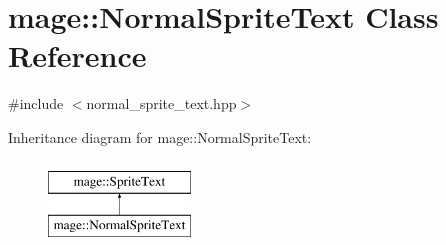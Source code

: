 \hypertarget{classmage_1_1_normal_sprite_text}{}\section{mage\+:\+:Normal\+Sprite\+Text Class Reference}
\label{classmage_1_1_normal_sprite_text}


{\ttfamily \#include $<$normal\+\_\+sprite\+\_\+text.\+hpp$>$}

Inheritance diagram for mage\+:\+:Normal\+Sprite\+Text\+:\begin{figure}[H]
\begin{center}
\leavevmode
\includegraphics[height=2.000000cm]{classmage_1_1_normal_sprite_text}
\end{center}
\end{figure}
